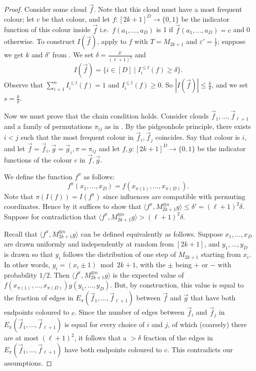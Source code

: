 \documentclass[a4paper,11pt, DIV=11]{scrartcl}
\renewcommand{\epsilon}{\varepsilon}
\theoremstyle{plain}
\theoremstyle{definition}
\begin{document}
\begin{proof}
    Consider some cloud $\vec{f}$. Note that this cloud must have a most frequent colour; let $c$ be that colour, and let $f : [2k + 1]^D \to \{0, 1\}$ be the indicator function of this colour inside $\vec{f}$ i.e.~$f(a_1, \ldots, a_D)$ is 1 if $\vec{f}(a_1, \ldots, a_D) = c$ and 0 otherwise. To construct $I(\vec{f})$, apply  to $f$ with $T = M_{2k + 1}$ and $\epsilon'= \frac{1}{\ell}$; suppose we get $k$ and $\delta'$ from . We set $\delta = \frac{\delta'}{(\ell + 1)^2}$ and 
    \[
    I(\vec{f}) = \{ i \in [D] \mid I_i^{\leq t}(f) \geq \delta \}.
    \]
    Observe that $\sum_{i = 1}^n I_i^{\leq t}(f) = 1$ and $I_i^{\leq t}(f) \geq 0$. So $|I(\vec{f})| \leq \frac{k}{\delta}$, and we set $s = \frac{k}{\delta}$.

    Now we must prove that the chain condition holds. Consider clouds $\vec{f}_1, \ldots, \vec{f}_{\ell + 1}$ and a family of permutations $\pi_{ij}$ as in . By the pidgeonhole principle, there exists $i < j$ such that the most frequent colour in $\vec{f}_i, \vec{f}_j$ coincides. Say that colour is $i$, and let $\vec{f} = \vec{f}_i, \vec{g} = \vec{g}_i, \pi = \pi_{ij}$ and let $f, g : [2k + 1]^{D} \to \{0, 1\}$ be the indicator functions of the colour $c$ in $\vec{f}, \vec{g}$.

    We define the function $f^{\pi}$ as follows:
    \[
    f^\pi(x_1, \ldots, x_D) = f(x_{\pi(1)}, \ldots, x_{\pi(D)}).
    \]
    Note that $\pi(I(f)) = I(f^{\pi})$ since influences are compatible with permuting coordinates. Hence by  it suffices to show that $\langle f^\pi, M_{2k + 1}^{\otimes n} g\rangle \leq \delta' = (\ell + 1)^2 \delta$. Suppose for contradiction that $\langle f^\pi, M_{2k + 1}^{\otimes n} g \rangle > (\ell + 1)^2 \delta$.

    Recall that $\langle f^\pi, M_{2k + 1}^{\otimes n} g \rangle$ can be defined equivalently as follows. Suppose $x_1, \ldots, x_D$ are drawn uniformly and independently at random from $[2k + 1]$, and $y_1, \ldots, y_D$ is drawn so that $y_i$ follows the distribution of one step of $M_{2k + 1}$ starting from $x_i$. In other words, $y_i = (x_i \pm 1) \bmod 2k + 1$, with the $\pm$ being $+$ or $-$ with probability $1/2$. Then $\langle f^\pi, M_{2k + 1}^{\otimes n} g \rangle$ is the expected value of $f(x_{\pi(1)}, \ldots, x_{\pi(D)}) g(y_1, \ldots, y_D)$. But, by construction, this value is equal to the fraction of edges in $E_\pi(\vec{f}_1, \ldots, \vec{f}_{\ell + 1})$ between $\vec{f}$ and $\vec{g}$ that have both endpoints coloured to $c$. Since the number of edges between $\vec{f}_i$ and $\vec{f}_j$ in $E_\pi(\vec{f}_1, \ldots, \vec{f}_{\ell + 1})$ is equal for every choice of $i$ and $j$, of which (coarsely) there are at most $(\ell + 1)^2$, it follows that a $> \delta$ fraction of the edges in $E_{\pi}(\vec{f}_1, \ldots, \vec{f}_{\ell + 1})$ have both endpoints coloured to $c$. This contradicts our assumptions.
\end{proof}
 
\end{document}
